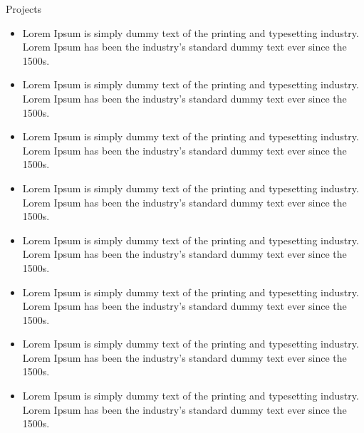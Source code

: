 \documentclass{resume}
\begin{document}
\begin{experienceSection}{Projects}
    \projectItem[
        title={Unity-Based Math Quiz Game for Kids},
        duration={Jan 2024 – May 2024}
    ]
    \begin{itemize}
        \vspace{-0.5em}
        \itemsep -6pt {}
        \item Lorem Ipsum is simply dummy text of the printing and typesetting industry. Lorem Ipsum has been the industry's standard dummy text ever since the 1500s.
        \item Lorem Ipsum is simply dummy text of the printing and typesetting industry. Lorem Ipsum has been the industry's standard dummy text ever since the 1500s.
        \item Lorem Ipsum is simply dummy text of the printing and typesetting industry. Lorem Ipsum has been the industry's standard dummy text ever since the 1500s.
        \item Lorem Ipsum is simply dummy text of the printing and typesetting industry. Lorem Ipsum has been the industry's standard dummy text ever since the 1500s.
    \end{itemize}

    \projectItem[
        title=Text-based Cricket Game Simulation,
        duration=Jun 2023 - Aug 2024
    ]
    \begin{itemize}
        \vspace{-0.5em}
        \itemsep -6pt {}
        \item Lorem Ipsum is simply dummy text of the printing and typesetting industry. Lorem Ipsum has been the industry's standard dummy text ever since the 1500s.
        \item Lorem Ipsum is simply dummy text of the printing and typesetting industry. Lorem Ipsum has been the industry's standard dummy text ever since the 1500s.
        \item Lorem Ipsum is simply dummy text of the printing and typesetting industry. Lorem Ipsum has been the industry's standard dummy text ever since the 1500s.
        \item Lorem Ipsum is simply dummy text of the printing and typesetting industry. Lorem Ipsum has been the industry's standard dummy text ever since the 1500s.
    \end{itemize}
\end{experienceSection}
\end{document}

